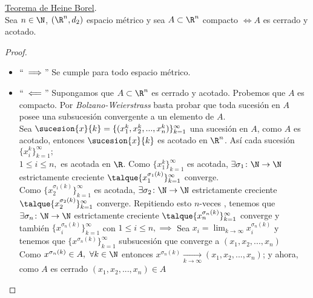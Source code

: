 	\begin{teor}\underline{Teorema de Heine Borel}.\\
		Sea $n\in\N$, $(\R^n,d_2)$ espacio métrico y sea $A\subset \R^n$ compacto $\iff A$ es cerrado y acotado.
		\begin{proof}
		\ 
			\begin{itemize}
				\item $``\implies$'' Se cumple para todo espacio métrico.
				\item $``\impliedby$'' Supongamos que $A\subset\R^n$ es cerrado y acotado. Probemos que $A$ es compacto. Por \textit{Bolzano-Weierstrass} basta probar que toda sucesión en $A$ posee una subsucesión convergente a un elemento de $A$.\\
	Sea $\sucesion{x}{k}=\{(x_1^k,x_2^k,...,x_n^k)\}^\infty_{k=1}$ una sucesión en $A$, como $A$ es acotado, entonces $\sucesion{x}{k}$ es acotado en $\R^n$. Así cada sucesión $\{x_i^k\}_{k=1}^\infty;$\\
	$1\leq i\leq n,$ es acotada en $\R$. Como $\{x_1^k\}_{k=1}^\infty$ es acotada, $\exists\sigma_1\colon \N\to\N$ estrictamente creciente $\talque \{x_1^{\sigma_1 (k)}\}^\infty_{k=1}$ converge.\\
	Como $\{x_2^{\sigma_1 (k)}\}_{k=1}^\infty$ es acotada, $\exists\sigma_2\colon \N\to\N$ estrictamente creciente $\talque \{x_2^{\sigma_2 (k)}\}^\infty_{k=1}$ converge. Repitiendo esto $n$-veces , tenemos que  $\exists\sigma_n\colon \N\to\N$ estrictamente creciente $\talque \{x_n^{\sigma_n (k)}\}^\infty_{k=1}$ converge y también $\{x_i^{\sigma_n (k)}\}^\infty_{k=1}$ con $1\leq i\leq n, \implies$ Sea $x_i=\lim_{k\rightarrow\infty} x_i^{\sigma_n(k)}$ y tenemos que         $\{x^{\sigma_n(k)}\}^\infty_{k=1}$ subsucesión que converge a $(x_1, x_2,...,x_n)$\\
	Como $x^{\sigma_n(k)} \in A,\ \forall k \in \N$ entonces $x^{\sigma_n(k)}\xrightarrow[k\rightarrow\infty]{}(x_1,x_2,...,x_n)$; y ahora, como $A$ es cerrado $(x_1,x_2,...,x_n)\in A$
			\end{itemize}
		\end{proof}
	\end{teor}
	
